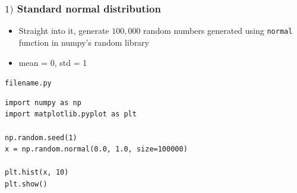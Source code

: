 \documentclass[english,14pt]{beamer}
\begin{document}
%
%
%
%

%
%
%
%

%
%
%
%


\begin{frame}[fragile]

\frametitle{$1)$ Standard normal distribution}

\begin{itemize}
	\item Straight into it, generate $100,000$ random numbers generated using \texttt{normal} function in numpy's random library
	\item mean = 0, std = 1
\end{itemize}



\texttt{filename.py}
\begin{lstlisting}[style=CStyle,basicstyle=\scriptsize]
import numpy as np
import matplotlib.pyplot as plt

np.random.seed(1)
x = np.random.normal(0.0, 1.0, size=100000)

plt.hist(x, 10)
plt.show() 
\end{lstlisting}

\end{frame}
\end{document}
